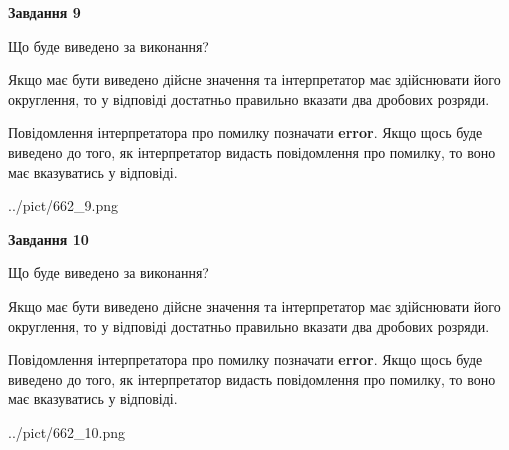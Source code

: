 \documentclass[12pt, ukrainian]{article}
\begin{document}
{\begin {Large}
{\begin {center}\textbf{Завдання 9}\end {center}}\par
Що буде виведено за виконання? \par

Якщо має бути виведено дійсне значення та інтерпретатор має здійснювати його округлення, 
то у відповіді достатньо правильно вказати два дробових розряди.

Повідомлення інтерпретатора про помилку позначати \textbf{error}.
Якщо щось буде виведено до того, як інтерпретатор видасть повідомлення про помилку, 
то воно має вказуватись у відповіді. \par

\begin{center}
	{../pict/662_9.png}
\end{center}
\newpage

{\begin {center}\textbf{Завдання 10}\end {center}}\par
Що буде виведено за виконання? \par

Якщо має бути виведено дійсне значення та інтерпретатор має здійснювати його округлення, 
то у відповіді достатньо правильно вказати два дробових розряди.

Повідомлення інтерпретатора про помилку позначати \textbf{error}.
Якщо щось буде виведено до того, як інтерпретатор видасть повідомлення про помилку, 
то воно має вказуватись у відповіді. \par

\begin{center}
	{../pict/662_10.png}
\end{center}
\newpage

\end {Large}}
\end{document}
